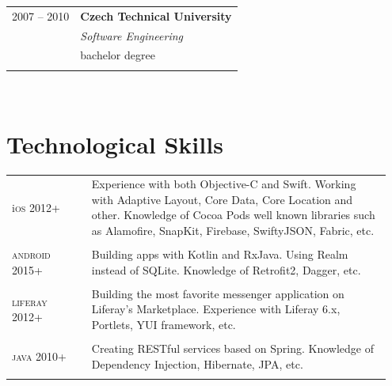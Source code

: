\documentclass[10pt]{article} %
\begin{document}
\begin{minipage}[t]{0.5\textwidth}
\begin{tabular}{@{}rl@{}}

\small\textsc{2007 -- 2010} & \large\textbf{Czech Technical University} \\ 
& \normalsize\textit{Software Engineering} \\ 
& \normalsize {bachelor degree} \\ 
&\\

\end{tabular}\\[10pt]



\section{Technological Skills} 

\medskip
\begin{tabular}{@{}p{0.2\linewidth}p{0.75\linewidth}@{}} 

\small{i}\large\textsc{os} \newline \small\textsc{2012+} & 
Experience with both Objective-C and Swift. Working with Adaptive Layout, Core Data, Core Location and other.\newline
Knowledge of Cocoa Pods well known libraries such as Alamofire, SnapKit, Firebase, 
\newline SwiftyJSON, Fabric, etc. \\
&\\

\large\textsc{android} \newline \small\textsc{2015+} & 
Building apps with Kotlin and RxJava. \newline Using Realm instead of SQLite.
Knowledge of  Retrofit2, Dagger, etc. \\
&\\

\large\textsc{liferay} \newline \small\textsc{2012+} & 
Building the most favorite messenger application on Liferay's Marketplace.
Experience with Liferay 6.x, Portlets, YUI framework, etc. \\
&\\

\large\textsc{java} \newline \small\textsc{2010+} & 
Creating RESTful services based on Spring. Knowledge of Dependency Injection, Hibernate, JPA, etc. \\
&\\


\end{tabular}
\end{minipage}
\end{document}
